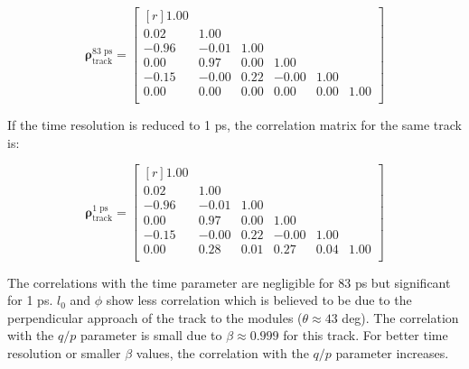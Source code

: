 
\begin{equation*}
    \mathbf{\rho}^\text{83 ps}_\text{track} =
    \begin{bmatrix*}[r]
        1.00 & & & & & \\
        0.02 & 1.00 & & & & \\
        -0.96 & -0.01 & 1.00 & & & \\
        0.00 & 0.97 & 0.00 & 1.00 & & \\
        -0.15 & -0.00 & 0.22 & -0.00 & 1.00 & \\
        0.00 & 0.00 & 0.00 & 0.00 & 0.00 & 1.00 \\
    \end{bmatrix*}
\end{equation*}

If the time resolution is reduced to 1 ps, the correlation matrix for the same track is:


\begin{equation*}
    \mathbf{\rho}^\text{1 ps}_\text{track} =
    \begin{bmatrix*}[r]
        1.00 & & & & & \\
        0.02 & 1.00 & & & & \\
        -0.96 & -0.01 & 1.00 & & & \\
        0.00 & 0.97 & 0.00 & 1.00 & & \\
        -0.15 & -0.00 & 0.22 & -0.00 & 1.00 & \\
        0.00 & 0.28 & 0.01 & 0.27 & 0.04 & 1.00 \\
    \end{bmatrix*}
\end{equation*}

The correlations with the time parameter are negligible for 83 ps but significant for 1 ps. $l_0$ and $\phi$ show less correlation which is believed to be due to the perpendicular approach of the track to the modules ($\theta \approx 43$ deg). The correlation with the $q/p$ parameter is small due to $\beta \approx 0.999$ for this track. For better time resolution or smaller $\beta$ values, the correlation with the $q/p$ parameter increases.

